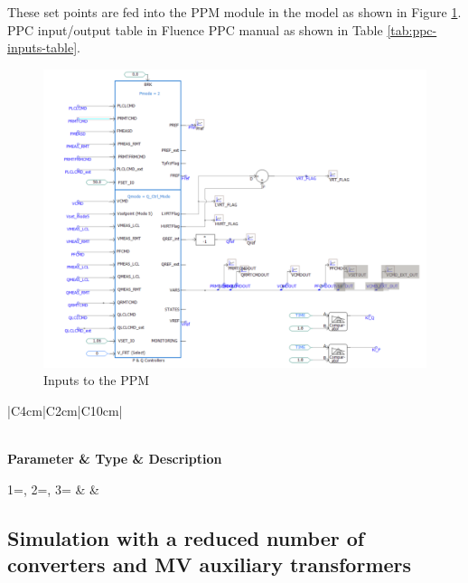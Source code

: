\documentclass{../grid-link-report}
\begin{document}
	

	These set points are fed into the PPM module in the model as shown in Figure \ref{fig:ppm-inputs}.  PPC input/output table in Fluence PPC manual as shown in Table \ref{tab:ppc-inputs-table}.
	
	
	\begin{figure}[H]
		\centering
		\includegraphics[width=\textwidth]{report-assets/images/ppm-inputs.png}
		\caption{Inputs to the PPM}
		\label{fig:ppm-inputs}
	\end{figure}
		
{
	\thicktablelines
	\begin{longtable}{|C{4cm}|C{2cm}|C{10cm}|} 
		\caption{PPC input set point table}
		\label{tab:ppc-inputs-table}
		\\	
		\toprule
		\bfseries \color{white}Parameter & \bfseries \color{white}Type & \bfseries \color{white}Description\\
		\endhead
		\bottomrule \endfoot
		
		{1=\CSVVariable, 2=\CSVType, 3=\CSVDescription}
		{\CSVVariable & \CSVType & \CSVDescription}
		\\\hline
		
	\end{longtable}
}

	
	\subsection{Simulation with a reduced number of converters and MV auxiliary transformers}
	
\end{document}
